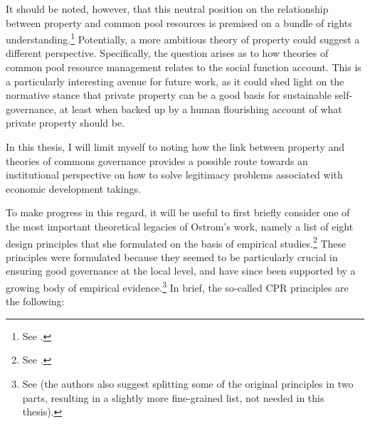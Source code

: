 It should be noted, however, that this neutral position on the relationship between property and common pool resources is premised on a bundle of rights understanding.\footnote{See \cite[59]{ostrom10b}.} Potentially, a more ambitious theory of property could suggest a different perspective. Specifically, the question arises as to how theories of common pool resource management relates to the social function account. This is a particularly interesting avenue for future work, as it could shed light on the normative stance that private property can be a good basis for sustainable self-governance, at least when backed up by a human flourishing account of what private property should be.

In this thesis, I will limit myself to noting how the link between property and theories of commons governance provides a possible route towards an institutional perspective on how to solve legitimacy problems associated with economic development takings.

To make progress in this regard, it will be useful to first briefly consider one of the most important theoretical legacies of Ostrom's work, namely a list of eight design principles that she formulated on the basis of empirical studies.\footnote{See \cite[90]{ostrom90}.} These principles were formulated because they seemed to be particularly crucial in ensuring good governance at the local level, and have since been supported by a growing body of empirical evidence.\footnote{See \cite{cox10} (the authors also suggest splitting some of the original principles in two parts, resulting in a slightly more fine-grained list, not needed in this thesis). } In brief, the so-called CPR principles are the following:

